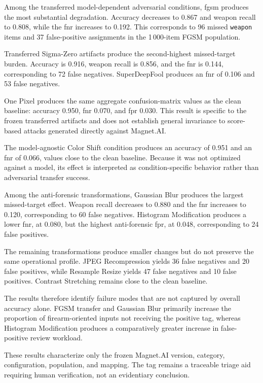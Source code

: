 Among the transferred model-dependent adversarial conditions, \gls{fgsm}
produces the most substantial degradation. Accuracy decreases to 0.867 and
weapon recall to 0.808, while the \gls{fnr} increases to 0.192. This
corresponds to 96 missed \texttt{weapon} items and 37 false-positive
assignments in the 1\,000-item FGSM population.

Transferred Sigma-Zero artifacts produce the second-highest missed-target
burden. Accuracy is 0.916, weapon recall is 0.856, and the \gls{fnr} is 0.144,
corresponding to 72 false negatives. SuperDeepFool produces an \gls{fnr} of
0.106 and 53 false negatives.

One Pixel produces the same aggregate confusion-matrix values as the clean
baseline: accuracy 0.950, \gls{fnr} 0.070, and \gls{fpr} 0.030. This result is
specific to the frozen transferred artifacts and does not establish general
invariance to score-based attacks generated directly against Magnet.AI.

The model-agnostic Color Shift condition produces an accuracy of 0.951 and an
\gls{fnr} of 0.066, values close to the clean baseline. Because it was not
optimized against a model, its effect is interpreted as condition-specific
behavior rather than adversarial transfer success.

Among the anti-forensic transformations, Gaussian Blur produces the largest
missed-target effect. Weapon recall decreases to 0.880 and the \gls{fnr}
increases to 0.120, corresponding to 60 false negatives. Histogram
Modification produces a lower \gls{fnr}, at 0.080, but the highest
anti-forensic \gls{fpr}, at 0.048, corresponding to 24 false positives.

The remaining transformations produce smaller changes but do not preserve the
same operational profile. JPEG Recompression yields 36 false negatives and 20
false positives, while Resample Resize yields 47 false negatives and 10 false
positives. Contrast Stretching remains close to the clean baseline.

The results therefore identify failure modes that are not captured by overall
accuracy alone. FGSM transfer and Gaussian Blur primarily increase the
proportion of firearm-oriented inputs not receiving the positive tag, whereas
Histogram Modification produces a comparatively greater increase in
false-positive review workload.

These results characterize only the frozen Magnet.AI version, category,
configuration, population, and mapping. The tag remains a traceable triage aid
requiring human verification, not an evidentiary conclusion.



